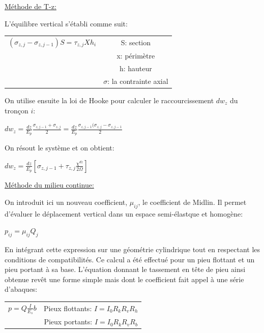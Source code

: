         \underline{Méthode de T-z:} 
        
        L'équilibre vertical s'établi comme suit: 
        
        \begin{center}
        \begin{tabular}{c|c}
            $(\sigma_{z,j} - \sigma_{z,j-1}) S = \tau_{z,j} X h_i$ \: \: \:
             &  S: section  \\
             &  x: périmètre  \\
             &  h: hauteur  \\
             &  $\sigma$: la contrainte axial  
        \end{tabular}
        \end{center}   
        
        On utilise ensuite la loi de Hooke pour calculer le raccourcissement $dw_z$ du tronçon $i$:
        
        \begin{center}
            $dw_z = \frac{dz}{E_p} \frac{\sigma_{z,j-1} + \sigma_{z,j}}{2} = \frac{dz}{E_p} \frac{\sigma_{z,j-1}(\sigma_{z,j}-\sigma_{z,j-1}}{2}$
        \end{center}
        
        On résout le système et on obtient:
        
        \begin{center}
            $dw_z = \frac{dz}{E_p} [\sigma_{z,j-1} + \tau_{z,j} \frac{\chi^{dz}}{2\Omega}]$
        \end{center} 
        
        \underline{Méthode du milieu continue:} 
        
        On introduit ici un nouveau coefficient, $\mu_{ij}$, le coefficient de Midlin. Il permet d'évaluer le déplacement vertical dans un espace semi-élastque et homogène:
        
        \begin{center}
            $p_{ij} = \mu_{ij} Q_j$
        \end{center} 
        
        En intégrant cette expression sur une géométrie cylindrique tout en respectant les conditions de compatibilités. Ce calcul a été effectué pour un pieu flottant et un pieu portant à sa base. L'équation donnant le tassement en tête de pieu ainsi obtenue revêt une forme simple mais dont le coefficient fait appel à une série d'abaques:
        
        \begin{center}
        \begin{tabular}{c|c}
             $p = Q \frac{I}{E_s} b $  \: \: \:
             &  Pieux flottants: $I = I_0 R_k R_v R_h $  \\
             &  Pieux portants: $I = I_0 R_k R_v R_b $  
        \end{tabular}
        \end{center}
        
